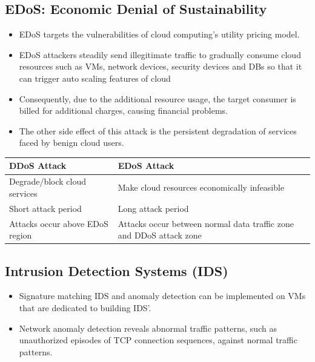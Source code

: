 \documentclass{article}
\begin{document}
\subsection{EDoS: Economic Denial of Sustainability}
\begin{itemize}
    \item EDoS targets the vulnerabilities of cloud computing's utility pricing model. 
    
    \item EDoS attackers steadily send illegitimate traffic to gradually consume cloud resources such as VMs, network devices, security devices and DBs so that it can trigger auto scaling features of cloud
    
    \item Consequently, due to the additional resource usage, the target consumer is billed for additional charges, causing financial problems.
    
    \item The other side effect of this attack is the persistent degradation of services faced by benign cloud users.
\end{itemize}

\begin{tabular}{|p{}|p{}|}
    \hline
    \textbf{DDoS Attack} & \textbf{EDoS Attack} \\
    \hline
    Degrade/block cloud services & Make cloud resources economically infeasible \\
    \hline
    Short attack period & Long attack period \\
    \hline
    Attacks occur above EDoS region & Attacks occur between normal data traffic zone and DDoS attack zone \\
    \hline
\end{tabular}
\subsection{Intrusion Detection Systems (IDS)}
\begin{itemize}
    \item Signature matching IDS and anomaly detection can be implemented on VMs that are dedicated to building IDS'. 
    
    \item Network anomaly detection reveals abnormal traffic patterns, such as unauthorized episodes of TCP connection sequences, against normal traffic patterns. 
\end{itemize}
\end{document}
